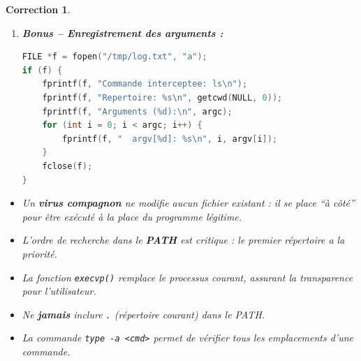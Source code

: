 \documentclass[a4paper,11pt]{article}
\theoremstyle{plain}
\newtheorem{correction}{Correction}
\theoremstyle{definition}
\begin{document}
\begin{correction}
\begin{enumerate}
\textbf{Autres contre-mesures :}
\begin{itemize}
\item Activer SELinux ou AppArmor
\item Surveiller les modifications de \texttt{.bashrc} et \texttt{.profile}
\item Utiliser \texttt{type -a ls} pour voir tous les \texttt{ls} disponibles
\end{itemize}

\item \textbf{Bonus -- Enregistrement des arguments :}

\begin{lstlisting}[language=C]
FILE *f = fopen("/tmp/log.txt", "a");
if (f) {
    fprintf(f, "Commande interceptee: ls\n");
    fprintf(f, "Repertoire: %s\n", getcwd(NULL, 0));
    fprintf(f, "Arguments (%d):\n", argc);
    for (int i = 0; i < argc; i++) {
        fprintf(f, "  argv[%d]: %s\n", i, argv[i]);
    }
    fclose(f);
}
\end{lstlisting}

\end{enumerate}

\begin{pointcle}
\begin{itemize}
    \item Un \textbf{virus compagnon} ne modifie aucun fichier existant : il se place ``à côté'' pour être exécuté à la place du programme légitime.
    \item L'ordre de recherche dans le \textbf{PATH} est critique : le premier répertoire a la priorité.
    \item La fonction \texttt{execvp()} remplace le processus courant, assurant la transparence pour l'utilisateur.
    \item Ne \textbf{jamais} inclure \texttt{.} (répertoire courant) dans le PATH.
    \item La commande \texttt{type -a <cmd>} permet de vérifier tous les emplacements d'une commande.
\end{itemize}
\end{pointcle}

\end{correction}

\bigskip

\end{document}
